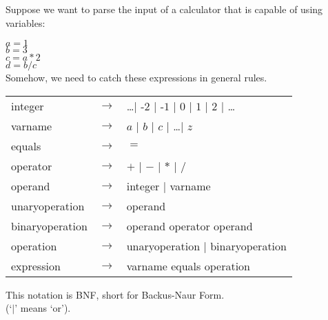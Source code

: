 \documentclass[a4, portrait]{seminar}
\providecommand{\mspace}{\vspace{0.5cm}}
\begin{document}
\begin{slide}

Suppose we want to parse the input of a calculator that is capable of using
variables:

$a = 1$\\
$b = 3$\\
$c = a * 2$\\
$d = b / c$\\

Somehow, we need to catch these expressions in general rules.
\vfill
\end{slide}

\begin{slide}

\begin{tabular}{lll}
integer & $\rightarrow$ & \ldots $|$ -$2$ $|$ -$1$ $|$ $0$ $|$ $1$ $|$ 
                          $2$ $|$ \ldots\\
varname & $\rightarrow$ & $a$ $|$ $b$ $|$ $c$ $|$ \ldots $|$ $z$\\
equals & $\rightarrow$ & $=$\\
operator & $\rightarrow$ & $+$ $|$ $-$ $|$ $*$ $|$ $/$\\
operand & $\rightarrow$ & integer $|$ varname\\
unaryoperation & $\rightarrow$ & operand\\
binaryoperation & $\rightarrow$ & operand operator operand\\
operation & $\rightarrow$ & unaryoperation $|$ binaryoperation\\
expression & $\rightarrow$ & varname equals operation\\
\end{tabular}
\mspace

This notation is BNF, short for Backus-Naur Form.\\
(`$|$' means `or').
\vfill
\end{slide}
\end{document}
